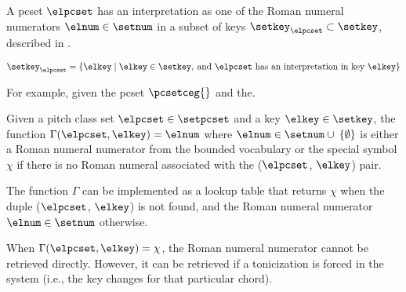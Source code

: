 
A \gls{pcset} $\elpcset$ has an interpretation as one of the
Roman numeral numerators $\elnum \in \setnum$ in a subset of
keys $\setkey_{\elpcset} \subset \setkey$, described in
.

\begin{equation}
    \label{eq:keys_for_pcset}
    \setkey_{\elpcset} = \{\elkey \mid \elkey \in \setkey,
     \: \text{and $\elpcset$ has an interpretation in key $\elkey$}\}
\end{equation}

For example, given the \gls{pcset} $\pcsetceg{}$ and the.

Given a pitch class set $\elpcset \in \setpcset$ and a key
$\elkey \in \setkey$, the function $\Gamma(\elpcset, \elkey)
= \elnum$ where $\elnum \in \setnum \cup \: \{ \emptyset \}$
is either a Roman numeral numerator from the bounded
vocabulary or the special symbol $\chi$ if there is no Roman
numeral associated with the ($\elpcset$, $\elkey$) pair.

The function $\Gamma$ can be implemented as a lookup table
that returns $\chi$ when the duple ($\elpcset$, $\elkey$) is
not found, and the Roman numeral numerator $\elnum \in
\setnum$ otherwise.

When $\Gamma(\elpcset, \elkey) = \chi$, the Roman numeral
numerator cannot be retrieved directly. However, it can be
retrieved if a tonicization is forced in the system (i.e.,
the key changes for that particular chord).

